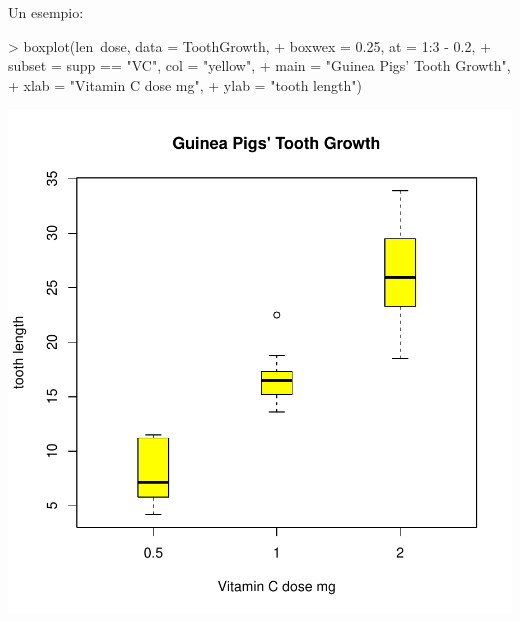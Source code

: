 \documentclass[onecolumn,11pt]{book}
\begin{document}
Un esempio:
\begin{Schunk}
\begin{Sinput}
> boxplot(len~dose, data = ToothGrowth, 
+ boxwex = 0.25, at = 1:3 - 0.2,
+ subset = supp == "VC", col = "yellow",
+ main = "Guinea Pigs' Tooth Growth",
+ xlab = "Vitamin C dose mg",
+ ylab = "tooth length")
\end{Sinput}
\end{Schunk}
\includegraphics{statisticaconR-355}
\end{document}
